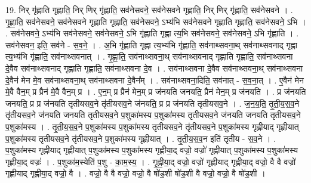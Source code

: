 \documentclass[17pt]{extarticle}
\begin{document}
19. निर् गृ॑ह्णाति गृह्णाति॒ निर् णिर् गृ॑ह्णाति॒ सव॑नेसवने॒ सव॑नेसवने गृह्णाति॒ निर् णिर् गृ॑ह्णाति॒ सव॑नेसवने । . गृ॒ह्णा॒ति॒ सव॑नेसवने॒ सव॑नेसवने गृह्णाति गृह्णाति॒ सव॑नेसवने॒ ऽभ्य॑भि सव॑नेसवने गृह्णाति गृह्णाति॒ सव॑नेसवने॒ ऽभि । . सव॑नेसवने॒ ऽभ्य॑भि सव॑नेसवने॒ सव॑नेसवने॒ ऽभि गृ॑ह्णाति गृह्णा त्य॒भि सव॑नेसवने॒ सव॑नेसवने॒ ऽभि गृ॑ह्णाति । . सव॑नेसवन॒ इति॒ सव॑ने - स॒व॒ने॒ । . अ॒भि गृ॑ह्णाति गृह्णा त्य॒भ्य॑भि गृ॑ह्णाति॒ सव॑नाथ्सवना॒थ् सव॑नाथ्सवनाद् गृह्णा त्य॒भ्य॑भि गृ॑ह्णाति॒ सव॑नाथ्सवनात् । . गृ॒ह्णा॒ति॒ सव॑नाथ्सवना॒थ् सव॑नाथ्सवनाद् गृह्णाति गृह्णाति॒ सव॑नाथ्सवना दे॒वैव सव॑नाथ्सवनाद् गृह्णाति गृह्णाति॒ सव॑नाथ्सवना दे॒व । . सव॑नाथ्सवना दे॒वैव सव॑नाथ्सवना॒थ् सव॑नाथ्सवना दे॒वैन॑ मेन मे॒व सव॑नाथ्सवना॒थ् सव॑नाथ्सवना दे॒वैन᳚म् । . सव॑नाथ्सवना॒दिति॒ सव॑नात् - स॒व॒ना॒त् । . ए॒वैन॑ मेन मे॒वै वैन॒म् प्र प्रैन॑ मे॒वै वैन॒म् प्र । . ए॒न॒म् प्र प्रैन॑ मेन॒म् प्र ज॑नयति जनयति॒ प्रैन॑ मेन॒म् प्र ज॑नयति । . प्र ज॑नयति जनयति॒ प्र प्र ज॑नयति तृतीयसव॒ने तृ॑तीयसव॒ने ज॑नयति॒ प्र प्र ज॑नयति तृतीयसव॒ने । . ज॒न॒य॒ति॒ तृ॒ती॒य॒स॒व॒ने तृ॑तीयसव॒ने ज॑नयति जनयति तृतीयसव॒ने प॒शुका॑मस्य प॒शुका॑मस्य तृतीयसव॒ने ज॑नयति जनयति तृतीयसव॒ने प॒शुका॑मस्य । . तृ॒ती॒य॒स॒व॒ने प॒शुका॑मस्य प॒शुका॑मस्य तृतीयसव॒ने तृ॑तीयसव॒ने प॒शुका॑मस्य गृह्णीयाद् गृह्णीयात् प॒शुका॑मस्य तृतीयसव॒ने तृ॑तीयसव॒ने प॒शुका॑मस्य गृह्णीयात् । . तृ॒ती॒य॒स॒व॒न इति॑ तृतीय - स॒व॒ने । . प॒शुका॑मस्य गृह्णीयाद् गृह्णीयात् प॒शुका॑मस्य प॒शुका॑मस्य गृह्णीया॒द् वज्रो॒ वज्रो॑ गृह्णीयात् प॒शुका॑मस्य प॒शुका॑मस्य गृह्णीया॒द् वज्रः॑ । . प॒शुका॑म॒स्येति॑ प॒शु - का॒म॒स्य॒ । . गृ॒ह्णी॒या॒द् वज्रो॒ वज्रो॑ गृह्णीयाद् गृह्णीया॒द् वज्रो॒ वै वै वज्रो॑ गृह्णीयाद् गृह्णीया॒द् वज्रो॒ वै । . वज्रो॒ वै वै वज्रो॒ वज्रो॒ वै षो॑ड॒शी षो॑ड॒शी वै वज्रो॒ वज्रो॒ वै षो॑ड॒शी । \newline
\end{document}
